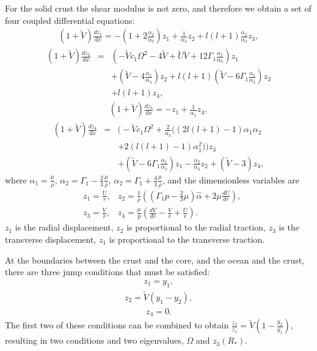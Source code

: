 \documentclass[fleqn,usenatbib]{mnras}
\begin{document}
\hspace{\parindent}For the solid crust the shear modulus is not zero, and therefore we obtain a set of four coupled differential equations:
\begin{align}
\left(1+\tilde{V}\right)\frac{dz_1}{dx}=-\left(1+2\frac{\alpha_2}{\alpha_3}\right)z_1+\frac{1}{\alpha_3}z_2+l\left(l+1\right)\frac{\alpha_2}{\alpha_3}z_3,
\label{eq:z1dr}
\end{align}
\begin{eqnarray}\nonumber
\left(1+\tilde{V}\right)\frac{dz_2}{dx}&=&\left(-\tilde{V}c_1\Omega^2-4\tilde{V}+\tilde{U}\tilde{V}+12\Gamma_1\frac{\alpha_1}{\alpha_3}\right)z_1\\\nonumber
&&+\left(\tilde{V}-4\frac{\alpha_1}{\alpha_3}\right)z_2+l\left(l+1\right)\left(\tilde{V}-6\Gamma_1\frac{\alpha_1}{\alpha_3}\right)z_3\\
&&+l\left(l+1\right)z_4,
\label{eq:z2dr}
\end{eqnarray}
\begin{align}
\left(1+\tilde{V}\right)\frac{dz_3}{dx}=-z_1+\frac{1}{\alpha_1}z_4,
\label{eq:z3dr}
\end{align}
\begin{eqnarray}\nonumber
\left(1+\tilde{V}\right)\frac{dz_4}{dx}&=& \biggr(-\tilde{V}c_1\Omega^2+\frac{2}{\alpha_3}\biggr((2l(l+1)-1)\alpha_1\alpha_2\\\nonumber
&&+2(l(l+1)-1)\alpha_1^2\biggr)\biggr)z_3\\
&&+\left(\tilde{V}-6\Gamma_1\frac{\alpha_1}{\alpha_3}\right)z_1-\frac{\alpha_2}{\alpha_3}z_2+(\tilde{V}-3)z_4,
\label{eq:z4dr}
\end{eqnarray}
\noindent where $\alpha_1=\frac{\mu}{\rho}$, $\alpha_2=\Gamma_1-\frac{2}{3}\frac{\mu}{\rho}$, $\alpha_2=\Gamma_1+\frac{4}{3}\frac{\mu}{\rho}$, and the dimensionless variables are 
\begin{eqnarray}
&z_1=\frac{U}{r},&z_2=\frac{1}{\rho}\left((\Gamma_1p-\frac{2}{3}\mu)\hat{\alpha}+2\mu\frac{dU}{dr}\right),\\
&z_3=\frac{V}{r},&z_4=\frac{\mu}{p}\left(\frac{dV}{dr}-\frac{V}{r}+\frac{U}{r}\right).
\label{eq:z1z2z3z4}
\end{eqnarray}
\noindent $z_1$ is the radial displacement, $z_2$ is proportional to the radial traction, $z_3$ is the transverse displacement, $z_1$ is proportional to the transverse traction.



\hspace{\parindent}At the boundaries between the crust and the core, and the ocean and the crust, there are three jump conditions that must be satisfied:
\begin{align}
z_1=y_1,
\label{eq:jump1}
\end{align}
\begin{align}
z_2=\tilde{V}(y_1-y_2),
\label{eq:jump2}
\end{align}
\begin{align}
z_4=0.
\label{eq:jump3}
\end{align}
\noindent The first two of these conditions can be combined to obtain $\frac{z_2}{z_1}=\tilde{V}\left(1-\frac{y_2}{y_1}\right)$, resulting in two conditions and two eigenvalues, $\Omega$ and $z_3(R_*)$. 
\end{document}
